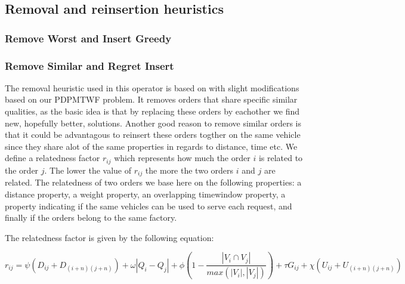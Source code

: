 \documentclass[a4paper,10pt]{article}
\begin{document}
\subsection{Removal and reinsertion heuristics}
\subsubsection{Remove Worst and Insert Greedy}
\subsubsection{Remove Similar and Regret Insert}
The removal heuristic used in this operator is based on \citet{shaw97} with slight modifications based on our PDPMTWF problem. 
It removes orders that share specific similar qualities, as the basic idea is that by replacing these orders by eachother we find new, hopefully better, solutions. 
Another good reason to remove similar orders is that it could be advantagous to reinsert these orders togther on the same vehicle since they share alot of the same properties in regards to distance, time etc.
We define a relatedness factor $r_{ij}$ which represents how much the order $i$ is related to the order $j$. 
The lower the value of $r_{ij}$ the more the two orders $i$ and $j$ are related.
The relatedness of two orders we base here on the following properties: 
a distance property, a weight property, an overlapping timewindow property, a property indicating if the same vehicles can be used to serve each request, and finally if the orders belong to the same factory.

The relatedness factor is given by the following equation:

\begin{equation}
\label{relatedness}
    r_{ij} = \psi ( D_{i j} + D_{(i+n)(j+n)}) + \omega|Q_i - Q_j|
    + \phi (1-\dfrac{|V_i\cap V_j|}{max(|V_i|, |V_j|)} ) + \tau G_{ij} + \chi (U_{ij} + U_{(i+n)(j+n)})
\end{equation}
\end{document}
